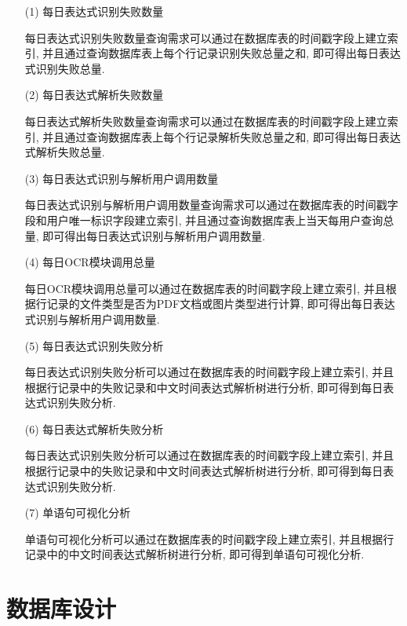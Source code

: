 \begin{enumerate}
  \item[(1)] 每日表达式识别失败数量

    每日表达式识别失败数量查询需求可以通过在数据库表的时间戳字段上建立索引, 并且通过查询数据库表上每个行记录识别失败总量之和, 即可得出每日表达式识别失败总量.

  \item[(2)] 每日表达式解析失败数量

    每日表达式解析失败数量查询需求可以通过在数据库表的时间戳字段上建立索引, 并且通过查询数据库表上每个行记录解析失败总量之和, 即可得出每日表达式解析失败总量.

  \item[(3)] 每日表达式识别与解析用户调用数量

    每日表达式识别与解析用户调用数量查询需求可以通过在数据库表的时间戳字段和用户唯一标识字段建立索引, 并且通过查询数据库表上当天每用户查询总量, 即可得出每日表达式识别与解析用户调用数量.

  \item[(4)] 每日OCR模块调用总量

    每日OCR模块调用总量可以通过在数据库表的时间戳字段上建立索引, 并且根据行记录的文件类型是否为PDF文档或图片类型进行计算, 即可得出每日表达式识别与解析用户调用数量.

  \item[(5)] 每日表达式识别失败分析

    每日表达式识别失败分析可以通过在数据库表的时间戳字段上建立索引, 并且根据行记录中的失败记录和中文时间表达式解析树进行分析, 即可得到每日表达式识别失败分析.

  \item[(6)] 每日表达式解析失败分析

    每日表达式识别失败分析可以通过在数据库表的时间戳字段上建立索引, 并且根据行记录中的失败记录和中文时间表达式解析树进行分析, 即可得到每日表达式识别失败分析.

  \item[(7)] 单语句可视化分析

    单语句可视化分析可以通过在数据库表的时间戳字段上建立索引, 并且根据行记录中的中文时间表达式解析树进行分析, 即可得到单语句可视化分析.
\end{enumerate}



\section{数据库设计}

